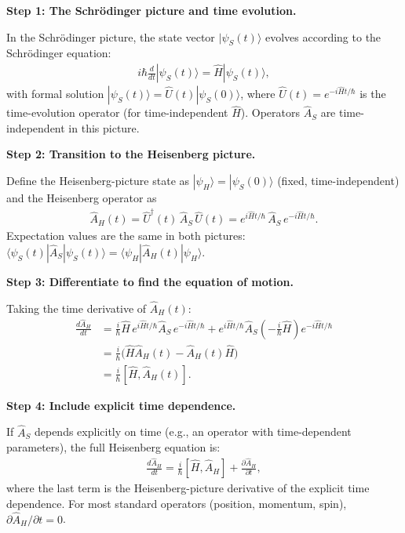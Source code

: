 \textbf{Step 1: The Schr\"odinger picture and time evolution.}

In the Schr\"odinger picture, the state vector $|\psi_S(t)\rangle$ evolves according to the Schr\"odinger equation:
\begin{align}
i\hbar\frac{d}{dt}|\psi_S(t)\rangle = \hat{H}|\psi_S(t)\rangle,
\end{align}
with formal solution $|\psi_S(t)\rangle = \hat{U}(t)|\psi_S(0)\rangle$, where $\hat{U}(t) = e^{-i\hat{H}t/\hbar}$ is the time-evolution operator (for time-independent $\hat{H}$). Operators $\hat{A}_S$ are time-independent in this picture.

\textbf{Step 2: Transition to the Heisenberg picture.}

Define the Heisenberg-picture state as $|\psi_H\rangle = |\psi_S(0)\rangle$ (fixed, time-independent) and the Heisenberg operator as
\begin{align}
\hat{A}_H(t) = \hat{U}^\dagger(t)\,\hat{A}_S\,\hat{U}(t) = e^{i\hat{H}t/\hbar}\,\hat{A}_S\,e^{-i\hat{H}t/\hbar}.
\end{align}
Expectation values are the same in both pictures: $\langle\psi_S(t)|\hat{A}_S|\psi_S(t)\rangle = \langle\psi_H|\hat{A}_H(t)|\psi_H\rangle$.

\textbf{Step 3: Differentiate to find the equation of motion.}

Taking the time derivative of $\hat{A}_H(t)$:
\begin{align}
\frac{d\hat{A}_H}{dt} &= \frac{i}{\hbar}\hat{H}\,e^{i\hat{H}t/\hbar}\hat{A}_S\,e^{-i\hat{H}t/\hbar} + e^{i\hat{H}t/\hbar}\hat{A}_S\left(-\frac{i}{\hbar}\hat{H}\right)e^{-i\hat{H}t/\hbar} \\
&= \frac{i}{\hbar}\bigl(\hat{H}\hat{A}_H(t) - \hat{A}_H(t)\hat{H}\bigr) \\
&= \frac{i}{\hbar}[\hat{H}, \hat{A}_H(t)].
\end{align}

\textbf{Step 4: Include explicit time dependence.}

If $\hat{A}_S$ depends explicitly on time (e.g., an operator with time-dependent parameters), the full Heisenberg equation is:
\begin{align}
\boxed{\frac{d\hat{A}_H}{dt} = \frac{i}{\hbar}[\hat{H}, \hat{A}_H] + \frac{\partial\hat{A}_H}{\partial t},}
\end{align}
where the last term is the Heisenberg-picture derivative of the explicit time dependence. For most standard operators (position, momentum, spin), $\partial\hat{A}_H/\partial t = 0$.

